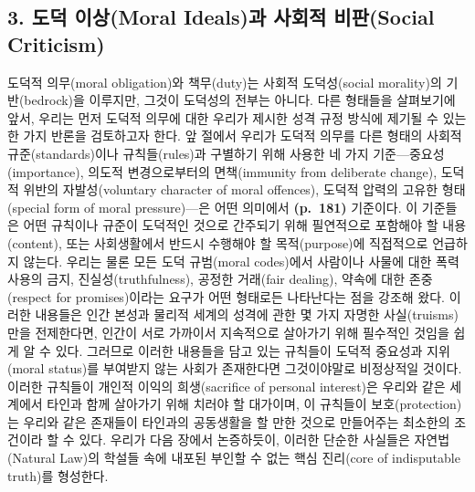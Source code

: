 \subsection{3. 도덕 이상(Moral Ideals)과 사회적 비판(Social
Criticism)}\label{uxb3c4uxb355-uxc774uxc0c1moral-idealsuxacfc-uxc0acuxd68cuxc801-uxbe44uxd310social-criticism}

도덕적 의무(moral obligation)와 책무(duty)는 사회적 도덕성(social
morality)의 기반(bedrock)을 이루지만, 그것이 도덕성의 전부는 아니다.
다른 형태들을 살펴보기에 앞서, 우리는 먼저 도덕적 의무에 대한 우리가
제시한 성격 규정 방식에 제기될 수 있는 한 가지 반론을 검토하고자 한다.
앞 절에서 우리가 도덕적 의무를 다른 형태의 사회적 규준(standards)이나
규칙들(rules)과 구별하기 위해 사용한 네 가지 기준---중요성(importance),
의도적 변경으로부터의 면책(immunity from deliberate change), 도덕적
위반의 자발성(voluntary character of moral offences), 도덕적 압력의
고유한 형태(special form of moral pressure)---은 어떤 의미에서
 \textbf{(p.~181)} 기준이다. 이 기준들은 어떤
규칙이나 규준이 도덕적인 것으로 간주되기 위해 필연적으로 포함해야 할
내용(content), 또는 사회생활에서 반드시 수행해야 할 목적(purpose)에
직접적으로 언급하지 않는다. 우리는 물론 모든 도덕 규범(moral codes)에서
사람이나 사물에 대한 폭력 사용의 금지, 진실성(truthfulness), 공정한
거래(fair dealing), 약속에 대한 존중(respect for promises)이라는 요구가
어떤 형태로든 나타난다는 점을 강조해 왔다. 이러한 내용들은 인간 본성과
물리적 세계의 성격에 관한 몇 가지 자명한 사실(truisms)만을 전제한다면,
인간이 서로 가까이서 지속적으로 살아가기 위해 필수적인 것임을 쉽게 알 수
있다. 그러므로 이러한 내용들을 담고 있는 규칙들이 도덕적 중요성과
지위(moral status)를 부여받지 않는 사회가 존재한다면 그것이야말로
비정상적일 것이다. 이러한 규칙들이  개인적 이익의
희생(sacrifice of personal interest)은 우리와 같은 세계에서 타인과 함께
살아가기 위해 치러야 할 대가이며, 이 규칙들이 
보호(protection)는 우리와 같은 존재들이 타인과의 공동생활을 할 만한
것으로 만들어주는 최소한의 조건이라 할 수 있다. 우리가 다음 장에서
논증하듯이, 이러한 단순한 사실들은 자연법(Natural Law)의 학설들 속에
내포된 부인할 수 없는 핵심 진리(core of indisputable truth)를 형성한다.

